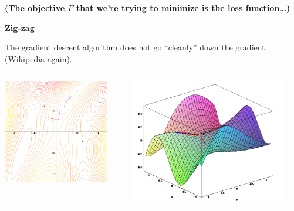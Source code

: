 \documentclass{beamer}
\newcommand{\placard}[1]{
  \begin{frame}
    \begin{center}
      \huge
      \textbf{#1}
    \end{center}
  \end{frame}
}
\newcommand{\pagestepalt}[2]{
  \begin{frame}[t]
    \begin{minipage}[t][0.26\textheight][t]{\textwidth}
      \begin{center}
        \huge
        \textbf{#1}
      \end{center}
    \end{minipage}
    
    \begin{minipage}[t][0.7\textheight][c]{\textwidth}
      #2
    \end{minipage}
  \end{frame}
}
\begin{document}
\placard{(The objective $F$ that we're trying to minimize is the loss function\ldots)}

\pagestepalt{Zig-zag}{
  The gradient descent algorithm does not go
  ``cleanly'' down the gradient (Wikipedia again).
  \vspace{-0.5cm}
  \begin{columns}[T]
    \begin{column}{0.49\textwidth}
      \begin{center}
        \includegraphics[width=0.9\textwidth]{grad1.png}
      \end{center}
    \end{column}
    \begin{column}{0.49\textwidth}
      \begin{center}
        \includegraphics[width=0.9\textwidth]{grad2.png}
      \end{center}
    \end{column}
  \end{columns}
}
\end{document}
